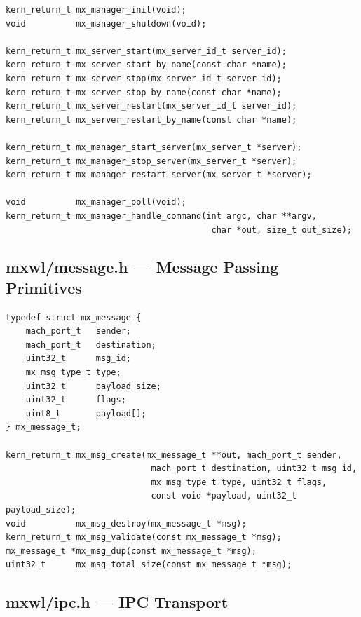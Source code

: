 \documentclass[a4paper,11pt]{article}
\begin{document}
\begin{lstlisting}
kern_return_t mx_manager_init(void);
void          mx_manager_shutdown(void);

kern_return_t mx_server_start(mx_server_id_t server_id);
kern_return_t mx_server_start_by_name(const char *name);
kern_return_t mx_server_stop(mx_server_id_t server_id);
kern_return_t mx_server_stop_by_name(const char *name);
kern_return_t mx_server_restart(mx_server_id_t server_id);
kern_return_t mx_server_restart_by_name(const char *name);

kern_return_t mx_manager_start_server(mx_server_t *server);
kern_return_t mx_manager_stop_server(mx_server_t *server);
kern_return_t mx_manager_restart_server(mx_server_t *server);

void          mx_manager_poll(void);
kern_return_t mx_manager_handle_command(int argc, char **argv,
                                         char *out, size_t out_size);
\end{lstlisting}

\subsection{mxwl/message.h --- Message Passing Primitives}

\begin{lstlisting}
typedef struct mx_message {
    mach_port_t   sender;
    mach_port_t   destination;
    uint32_t      msg_id;
    mx_msg_type_t type;
    uint32_t      payload_size;
    uint32_t      flags;
    uint8_t       payload[];
} mx_message_t;

kern_return_t mx_msg_create(mx_message_t **out, mach_port_t sender,
                             mach_port_t destination, uint32_t msg_id,
                             mx_msg_type_t type, uint32_t flags,
                             const void *payload, uint32_t payload_size);
void          mx_msg_destroy(mx_message_t *msg);
kern_return_t mx_msg_validate(const mx_message_t *msg);
mx_message_t *mx_msg_dup(const mx_message_t *msg);
uint32_t      mx_msg_total_size(const mx_message_t *msg);
\end{lstlisting}

\subsection{mxwl/ipc.h --- IPC Transport}
\end{document}
